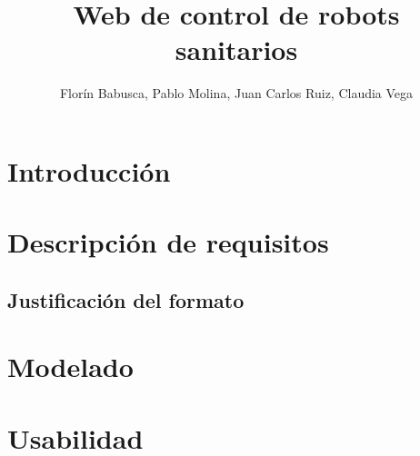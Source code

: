 \documentclass[12pt, a4paper]{exam}
\title{\textbf{Web de control de robots sanitarios}}
\author{Florín Babusca, Pablo Molina, Juan Carlos Ruiz, Claudia Vega}
\begin{document}

\begin{titlingpage}
\maketitle
\end{titlingpage}
\tableofcontents

\section{Introducción}

\section{Descripción de requisitos}
\label{sec:DocRequisitos}
    \subsection{Justificación del formato}
    


\section{Modelado}


\section{Usabilidad}


\printbibliography
\newpage


\end{document}
